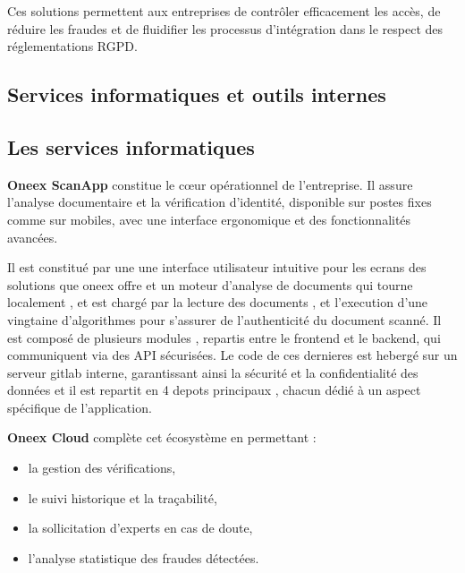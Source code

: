 Ces solutions permettent aux entreprises de contrôler efficacement les accès, de réduire les fraudes et de fluidifier les processus d’intégration dans le respect des réglementations RGPD.

\subsection{Services informatiques et outils internes}

\subsection{Les services informatiques}

\textbf{Oneex ScanApp} constitue le cœur opérationnel de l’entreprise. Il assure l’analyse documentaire et la vérification d’identité, disponible sur postes fixes comme sur mobiles, avec une interface ergonomique et des fonctionnalités avancées.

Il est constitué par une une interface utilisateur intuitive pour les ecrans des solutions que oneex offre et un moteur d’analyse de documents qui tourne localement , et est chargé par la lecture des documents , et l'execution d'une vingtaine d'algorithmes pour s'assurer de l'authenticité du document scanné.
Il est composé de plusieurs modules , repartis entre le frontend et le backend, qui communiquent via des API sécurisées.
Le code de ces dernieres est hebergé sur un serveur gitlab interne, garantissant ainsi la sécurité et la confidentialité des données et il est repartit en 4 depots principaux , chacun dédié à un aspect spécifique de l'application.

\textbf{Oneex Cloud} complète cet écosystème en permettant :

\begin{itemize}
	\item la gestion des vérifications,
	\item le suivi historique et la traçabilité,
	\item la sollicitation d’experts en cas de doute,
	\item l’analyse statistique des fraudes détectées.
\end{itemize}

